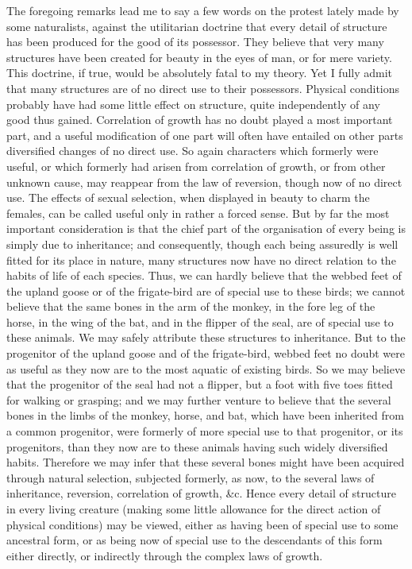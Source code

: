\indent The foregoing remarks lead me to say a few words on the protest lately made by some naturalists, against the utilitarian doctrine that every detail of structure has been produced for the good of its possessor. They believe that very many structures have been created for beauty in the eyes of man, or for mere variety. This doctrine, if true, would be absolutely fatal to my theory. Yet I fully admit that many structures are of no direct use to their possessors. Physical conditions probably have had some little effect on structure, quite independently of any good thus gained. Correlation of growth has no doubt played a most important part, and a useful modification of one part will often have entailed on other parts diversified changes of no direct use. So again characters which formerly were useful, or which formerly had arisen from correlation of growth, or from other unknown cause, may reappear from the law of reversion, though now of no direct use. The effects of sexual selection, when displayed in beauty to charm the females, can be called useful only in rather a forced sense. But by far the most important consideration is that the chief part of the organisation of every being is simply due to inheritance; and consequently, though each being assuredly is well fitted for its place in nature, many structures now have no direct relation to the habits of life of each species. Thus, we can hardly believe that the webbed feet of the upland goose or of the frigate-bird are of special use to these birds; we cannot believe that the same bones in the arm of the monkey, in the fore leg of the horse, in the wing of the bat, and in the flipper of the seal, are of special use to these animals. We may safely attribute these structures to inheritance. But to the progenitor of the upland goose and of the frigate-bird, webbed feet no doubt were as useful as they now are to the most aquatic of existing birds. So we may believe that the progenitor of the seal had not a flipper, but a foot with five toes fitted for walking or grasping; and we may further venture to believe that the several bones in the limbs of the monkey, horse, and bat, which have been inherited from a common progenitor, were formerly of more special use to that progenitor, or its progenitors, than they now are to these animals having such widely diversified habits. Therefore we may infer that these several bones might have been acquired through natural selection, subjected formerly, as now, to the several laws of inheritance, reversion, correlation of growth, \&c. Hence every detail of structure in every living creature (making some little allowance for the direct action of physical conditions) may be viewed, either as having been of special use to some ancestral form, or as being now of special use to the descendants of this form either directly, or indirectly through the complex laws of growth.\\
